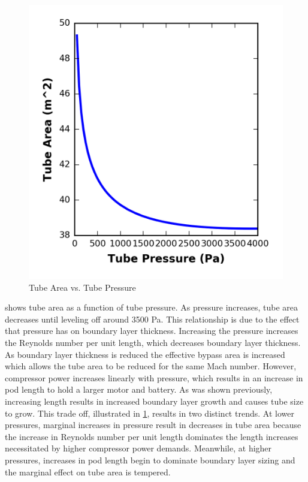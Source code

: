 \begin{figure}
	\centering
	\includegraphics[width=.45\textwidth]{../../images/graphs/pressure_trades/pressure_vs_Area.png}
	\caption{Tube Area vs. Tube Pressure}
	\label{fig:tube_area_vs_tube_press}
\end{figure}
 shows tube area as a function of tube pressure.
As pressure increases, tube area decreases until leveling off around 3500 Pa.
This relationship is due to the effect that pressure has on boundary layer thickness.
Increasing the pressure increases the Reynolds number per unit length,
which decreases boundary layer thickness. As boundary layer thickness is
reduced the effective bypass area is increased which allows the tube area to
be reduced for the same Mach number. However, compressor power increases
linearly with pressure, which results in an increase in pod length to hold a
larger motor and battery. As was shown previously, increasing length results in
increased boundary layer growth and causes tube size to grow. This trade off,
illustrated in \cref{fig:tube_area_vs_tube_press}, results in two distinct trends.
At lower pressures, marginal increases in pressure result in decreases in tube
area because the increase in Reynolds number per unit length dominates the
length increases necessitated by higher compressor power demands. Meanwhile,
at higher pressures, increases in pod length begin to dominate boundary layer
sizing and the marginal effect on tube area is tempered.
